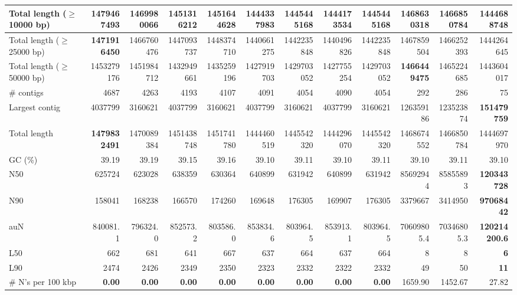 \documentclass[12pt,a4paper]{article}
\begin{document}
\begin{table}[ht]
\begin{center}
\begin{tabular}{|l*{11}{|r}|}
Total length ($\geq$ 10000 bp) & {\bf 1479467493} & 1469980066 & 1451316212 & 1451644628 & 1444337983 & 1445445168 & 1444173534 & 1445445168 & 1468630318 & 1466850784 & 1444688748 \\ \hline
Total length ($\geq$ 25000 bp) & {\bf 1471916450} & 1466760476 & 1447093737 & 1448374710 & 1440661275 & 1442235848 & 1440496826 & 1442235848 & 1467859504 & 1466252393 & 1444264645 \\ \hline
Total length ($\geq$ 50000 bp) & 1453279176 & 1451984712 & 1432949661 & 1435259196 & 1427919703 & 1429703052 & 1427755254 & 1429703052 & {\bf 1466449475} & 1465224685 & 1443604017 \\ \hline
\# contigs & 4687 & 4263 & 4193 & 4107 & 4091 & 4054 & 4090 & 4054 & 292 & 286 & 75 \\ \hline
Largest contig & 4037799 & 3160621 & 4037799 & 3160621 & 4037799 & 3160621 & 4037799 & 3160621 & 126359186 & 123523874 & {\bf 151479759} \\ \hline
Total length & {\bf 1479832491} & 1470089384 & 1451438748 & 1451741780 & 1444460519 & 1445542320 & 1444296070 & 1445542320 & 1468674552 & 1466850784 & 1444697970 \\ \hline
GC (\%) & 39.19 & 39.19 & 39.15 & 39.16 & 39.10 & 39.11 & 39.10 & 39.11 & 39.10 & 39.11 & 39.10 \\ \hline
N50 & 625724 & 623028 & 638359 & 630364 & 640899 & 631942 & 640899 & 631942 & 85692944 & 85855893 & {\bf 120343728} \\ \hline
N90 & 158041 & 168238 & 166570 & 174260 & 169648 & 176305 & 169907 & 176305 & 3379667 & 3414950 & {\bf 97068442} \\ \hline
auN & 840081.1 & 796324.0 & 852573.2 & 803586.0 & 853834.6 & 803964.5 & 853913.1 & 803964.5 & 70609805.4 & 70346805.3 & {\bf 120214200.6} \\ \hline
L50 & 662 & 681 & 641 & 667 & 637 & 664 & 637 & 664 & 8 & 8 & {\bf 6} \\ \hline
L90 & 2474 & 2426 & 2349 & 2350 & 2323 & 2332 & 2322 & 2332 & 49 & 50 & {\bf 11} \\ \hline
\# N's per 100 kbp & {\bf 0.00} & {\bf 0.00} & {\bf 0.00} & {\bf 0.00} & {\bf 0.00} & {\bf 0.00} & {\bf 0.00} & {\bf 0.00} & 1659.90 & 1452.67 & 27.82 \\ \hline
\end{tabular}
\end{center}
\end{table}
\end{document}
